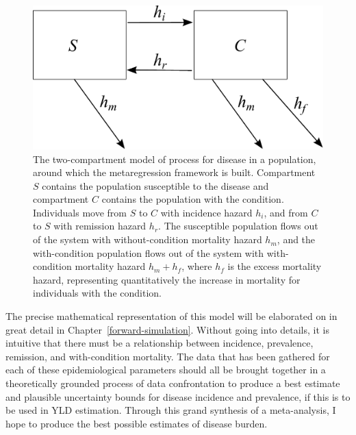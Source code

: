     \begin{figure}[h]
        \begin{center}
            \includegraphics[width=5in]{SC.pdf}
            \caption{The two-compartment model of process for disease in a population, around which the metaregression framework is built. Compartment $S$ contains the population susceptible to the disease and compartment $C$ contains the population with the condition. Individuals move from $S$ to $C$ with incidence hazard $h_i$, and from $C$ to $S$ with remission hazard $h_r$. The susceptible population flows out of the system with without-condition mortality hazard $h_m$, and the with-condition population flows out of the system with with-condition mortality hazard $h_m+h_f$, where $h_f$ is the excess mortality hazard, representing quantitatively the increase in mortality for individuals with the condition.}
            \label{forward-sim-two-compartment}
        \end{center}
    \end{figure}

The precise mathematical representation of this model will be
elaborated on in great detail in
Chapter~\ref{forward-simulation}. Without going into details, it is
intuitive that there must be a relationship between
incidence, prevalence, remission, and with-condition mortality. The
data that has been gathered for each of these epidemiological
parameters should all be brought together in a theoretically grounded
process of data confrontation to produce a best estimate and plausible
uncertainty bounds for disease incidence and prevalence, if this is to
be used in YLD estimation. Through this grand synthesis of a
meta-analysis, I hope to produce the best possible estimates of
disease burden.

